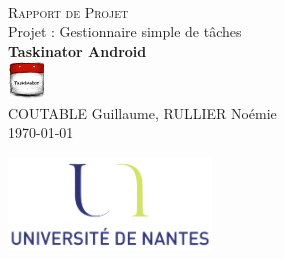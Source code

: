 \documentclass[a4paper,10pt]{article}
\begin{document}
\fancyhead[LE,CE,RE,LO,CO,RO]{}
\fancyfoot[LE,CE,RE,LO,CO,RO]{}
\renewcommand{\headrulewidth}{0.4pt}
\renewcommand{\footrulewidth}{0.4pt}

\begin{titlepage}

\vspace*{\fill}~
\begin{center}
{\large \textsc{Rapport de Projet}} \\
\vspace{1cm}
{\LARGE Projet : Gestionnaire simple de tâches} \\
\vspace{1cm}
\textbf{Taskinator Android} \\
\includegraphics[height=1cm]{Images/Taskinator.png} \\
\vspace{1cm}
COUTABLE Guillaume, RULLIER Noémie \\
\today
\end{center}
\vspace*{\fill}

\begin{center}
\noindent 
\includegraphics[height=2.5cm]{Images/universite.png}
\end{center}
\pagebreak
\end{titlepage}

\newpage
\tableofcontents  

\newpage
\pagestyle{fancy}

\end{document}
